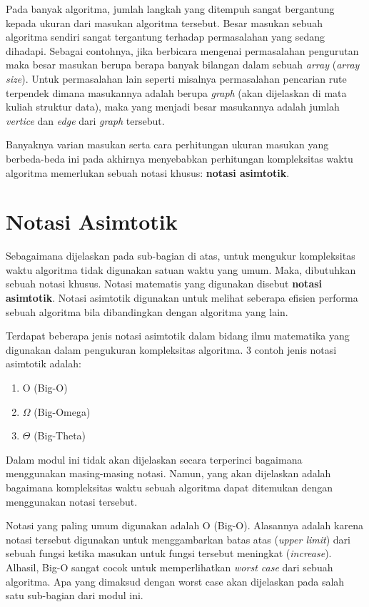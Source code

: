 Pada banyak algoritma, jumlah langkah yang ditempuh sangat bergantung kepada ukuran dari masukan algoritma tersebut. Besar masukan sebuah algoritma sendiri sangat tergantung terhadap permasalahan yang sedang dihadapi. Sebagai contohnya, jika berbicara mengenai permasalahan pengurutan maka besar masukan berupa berapa banyak bilangan dalam sebuah \textit{array} (\textit{array size}). Untuk permasalahan lain seperti misalnya permasalahan pencarian rute terpendek dimana masukannya adalah berupa \textit{graph} (akan dijelaskan di mata kuliah struktur data), maka yang menjadi besar masukannya adalah jumlah \textit{vertice} dan \textit{edge} dari \textit{graph} tersebut. 

Banyaknya varian masukan serta cara perhitungan ukuran masukan yang berbeda-beda ini pada akhirnya menyebabkan perhitungan kompleksitas waktu algoritma memerlukan sebuah notasi khusus: \textbf{notasi asimtotik}.

\section{Notasi Asimtotik}

Sebagaimana dijelaskan pada sub-bagian di atas, untuk mengukur kompleksitas waktu algoritma tidak digunakan satuan waktu yang umum. Maka, dibutuhkan sebuah notasi khusus. Notasi matematis yang digunakan disebut \textbf{notasi asimtotik}. Notasi asimtotik digunakan untuk melihat seberapa efisien performa sebuah algoritma bila dibandingkan dengan algoritma yang lain. 

Terdapat beberapa jenis notasi asimtotik dalam bidang ilmu matematika yang digunakan dalam pengukuran kompleksitas algoritma. 3 contoh jenis notasi asimtotik adalah:

\begin{enumerate}
    \item O (Big-O)
    \item $\Omega$ (Big-Omega)
    \item $\Theta$ (Big-Theta)
\end{enumerate}

Dalam modul ini tidak akan dijelaskan secara terperinci bagaimana menggunakan masing-masing notasi. Namun, yang akan dijelaskan adalah bagaimana kompleksitas waktu sebuah algoritma dapat ditemukan dengan menggunakan notasi tersebut.

Notasi yang paling umum digunakan adalah O (Big-O). Alasannya adalah karena notasi tersebut digunakan untuk menggambarkan batas atas (\textit{upper limit}) dari sebuah fungsi ketika masukan untuk fungsi tersebut meningkat (\textit{increase}). Alhasil, Big-O sangat cocok untuk memperlihatkan \textit{worst case} dari sebuah algoritma. Apa yang dimaksud dengan worst case akan dijelaskan pada salah satu sub-bagian dari modul ini.

